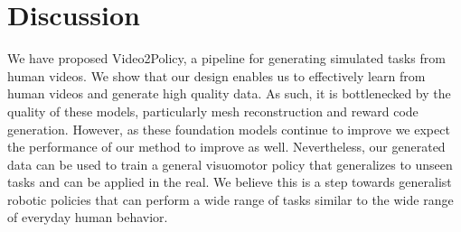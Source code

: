 \section{Discussion}

We have proposed Video2Policy, a pipeline for generating simulated tasks from human videos. We show that our design enables us to effectively learn from human videos and generate high quality data.
As such, it is bottlenecked by the quality of these models, particularly mesh reconstruction and reward code generation. However, as these foundation models continue to improve we expect the performance of our method to improve as well. 
Nevertheless, our generated data can be used to train a general visuomotor policy that generalizes to unseen tasks and can be applied in the real.
We believe this is a step towards generalist robotic policies that can perform a wide range of tasks similar to the wide range of everyday human behavior. 

